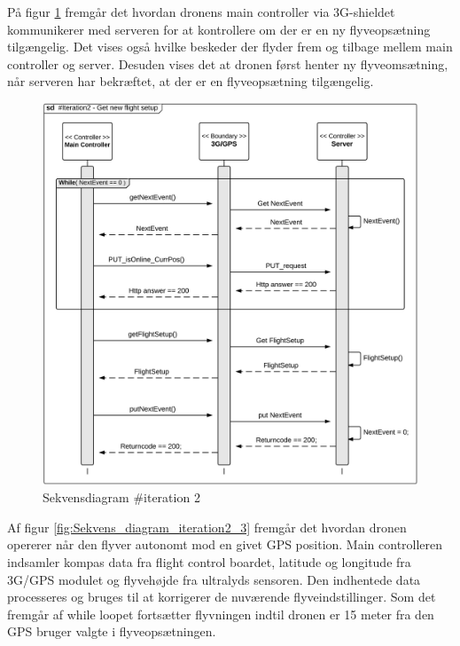 \newpage

På figur \ref{fig:Sekvens_diagram_iteration2_2} fremgår det hvordan dronens main controller via 3G-shieldet kommunikerer med serveren for at kontrollere om der er en ny flyveopsætning tilgængelig. Det vises også hvilke beskeder der flyder frem og tilbage mellem main controller og server. Desuden vises det at dronen først henter ny flyveomsætning, når serveren har bekræftet, at der er en flyveopsætning tilgængelig.   

\begin{figure}[H]
	\centering
	\includegraphics[width=1\textwidth]{Billeder/sekvens/sekvens_iteration2_2}
	\caption{Sekvensdiagram \#iteration 2}
	\label{fig:Sekvens_diagram_iteration2_2}
\end{figure}

\newpage

Af figur \ref{fig:Sekvens_diagram_iteration2_3} fremgår det hvordan dronen opererer når den flyver autonomt mod en givet GPS position. Main controlleren indsamler kompas data fra flight control boardet, latitude og longitude fra 3G/GPS modulet og flyvehøjde fra ultralyds sensoren. Den indhentede data processeres og bruges til at korrigerer de nuværende flyveindstillinger.
Som det fremgår af while loopet fortsætter flyvningen indtil dronen er 15 meter fra den GPS bruger valgte i flyveopsætningen. 


